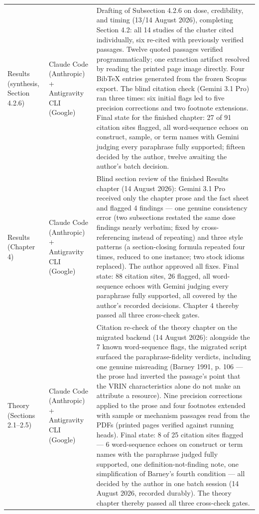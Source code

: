 \begin{longtable}{@{}p{2.9cm}p{3.2cm}p{9.0cm}@{}}
\addlinespace
Results (synthesis, Section 4.2.6) & Claude Code (Anthropic) + Antigravity CLI (Google) & Drafting of Subsection 4.2.6 on dose, credibility, and timing (13/14 August 2026), completing Section 4.2: all 14 studies of the cluster cited individually, six re-cited with previously verified passages. Twelve quoted passages verified programmatically; one extraction artifact resolved by reading the printed page image directly. Four BibTeX entries generated from the frozen Scopus export. The blind citation check (Gemini 3.1 Pro) ran three times: six initial flags led to five precision corrections and two footnote extensions. Final state for the finished chapter: 27 of 91 citation sites flagged, all word-sequence echoes on construct, sample, or term names with Gemini judging every paraphrase fully supported; fifteen decided by the author, twelve awaiting the author's batch decision. \\
\addlinespace
Results (Chapter 4) & Claude Code (Anthropic) + Antigravity CLI (Google) & Blind section review of the finished Results chapter (14 August 2026): Gemini 3.1 Pro received only the chapter prose and the fact sheet and flagged 4 findings --- one genuine consistency error (two subsections restated the same dose findings nearly verbatim; fixed by cross-referencing instead of repeating) and three style patterns (a section-closing formula repeated four times, reduced to one instance; two stock idioms replaced). The author approved all fixes. Final state: 88 citation sites, 26 flagged, all word-sequence echoes with Gemini judging every paraphrase fully supported, all covered by the author's recorded decisions. Chapter 4 thereby passed all three cross-check gates. \\
\addlinespace
Theory (Sections 2.1--2.5) & Claude Code (Anthropic) + Antigravity CLI (Google) & Citation re-check of the theory chapter on the migrated backend (14 August 2026): alongside the 7 known word-sequence flags, the migrated script surfaced the paraphrase-fidelity verdicts, including one genuine misreading (Barney 1991, p. 106 --- the prose had inverted the passage's point that the VRIN characteristics alone do not make an attribute a resource). Nine precision corrections applied to the prose and four footnotes extended with sample or mechanism passages read from the PDFs (printed pages verified against running heads). Final state: 8 of 25 citation sites flagged --- 6 word-sequence echoes on construct or term names with the paraphrase judged fully supported, one definition-not-finding note, one simplification of Barney's fourth condition --- all decided by the author in one batch session (14 August 2026, recorded durably). The theory chapter thereby passed all three cross-check gates. \\

\end{longtable}
